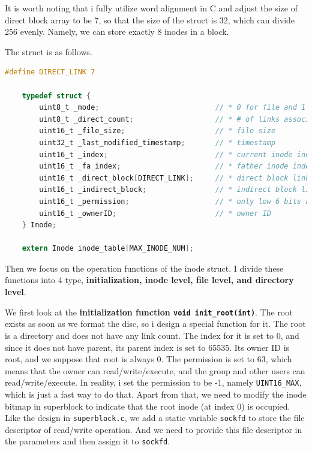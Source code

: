 It is worth noting that i fully utilize word alignment in C and adjust the size of direct block array to be 7, so that the size of the struct is 32, which can divide 256 evenly. Namely, we can store exactly
8 inodes in a block.

The struct is as follows. 

\begin{lstlisting}[language=C]
    #define DIRECT_LINK 7

    typedef struct {
        uint8_t _mode;                           // * 0 for file and 1 for dir
        uint8_t _direct_count;                   // * # of links associated with this file
        uint16_t _file_size;                     // * file size
        uint32_t _last_modified_timestamp;       // * timestamp
        uint16_t _index;                         // * current inode index
        uint16_t _fa_index;                      // * father inode index, -1 for not exist (65535)
        uint16_t _direct_block[DIRECT_LINK];     // * direct block link, store block id
        uint16_t _indirect_block;                // * indirect block link, one level
        uint16_t _permission;                    // * only low 6 bits are valid, owner & group permission
        uint16_t _ownerID;                       // * owner ID
    } Inode;
    
    extern Inode inode_table[MAX_INODE_NUM];
\end{lstlisting}

Then we focus on the operation functions of the inode struct. I divide these functions into 4 type,
\textbf{initialization, inode level, file level, and directory level}.

We first look at the \textbf{initialization function \texttt{void init\_root(int)}}. The root exists as soon as we format the disc, so 
i design a special function for it. The root is a directory and does not have any link count.
The index for it is set to 0, and since it does not have parent, its parent index is set to 65535.
Its owner ID is root, and we suppose that root is always 0. The permission is set to 63, which means that the owner can read/write/execute, and the group and other users can read/write/execute.
In reality, i set the permission to be -1, namely \texttt{UINT16_MAX}, which is just a fast way to do that. 
Apart from that, we need to modify the inode bitmap in superblock to indicate that the root inode (at index 0) is occupied.
Like the design in \texttt{superblock.c}, we add a static variable \texttt{sockfd} to store the file descriptor of read/write operation. And we
 need to provide this file descriptor in the parameters and then assign it to \texttt{sockfd}. 

